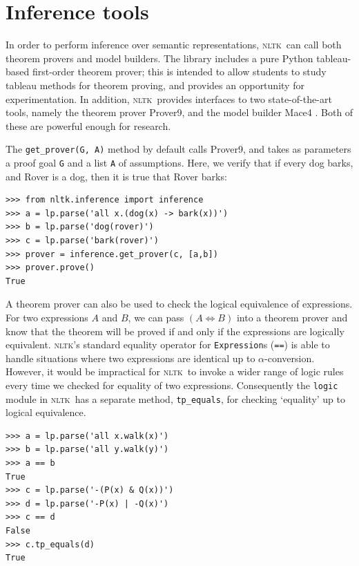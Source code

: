 \documentclass[11pt, a4paper]{article}
\newcommand{\NLTK}{\textsc{nltk}}
\newcommand{\dhgcode}[1]{{\tt #1}}
\begin{document}
\section{Inference tools}
In order to perform inference over semantic representations, \NLTK\
can call both theorem provers and model builders.
The library includes a pure Python tableau-based first-order theorem prover;
this is intended to allow students to study 
tableau methods for theorem proving, and provides an
opportunity for experimentation.  In addition, \NLTK\ provides
interfaces to two state-of-the-art tools, namely the theorem prover Prover9, 
and the model builder Mace4  \citep{McCune}.  Both of these are
powerful enough for research.

The \verb!get_prover(G, A)! method by default calls Prover9, and takes as
parameters a proof goal \texttt{G} and a list \texttt{A} of assumptions.
Here, we verify that if every dog barks, and Rover is a dog,
then it is true that Rover barks:
\begin{Verbatim}
>>> from nltk.inference import inference
>>> a = lp.parse('all x.(dog(x) -> bark(x))')
>>> b = lp.parse('dog(rover)')
>>> c = lp.parse('bark(rover)')
>>> prover = inference.get_prover(c, [a,b])
>>> prover.prove()
True
\end{Verbatim}

A theorem prover can also be used to check the logical equivalence of
expressions.  For two expressions $A$ and $B$, we can pass $(A\iff B)$
into a theorem prover and know that the theorem will be proved if and
only if the expressions are logically equivalent.  \NLTK's standard
equality operator for \texttt{Expression}s (\texttt{==}) is able to
handle situations where two expressions are identical up to
$\alpha$-conversion.  However, it would be impractical for \NLTK\ to
invoke a wider range of logic rules every time we checked for equality
of two expressions. Consequently the \texttt{logic} module in \NLTK\
has a separate method, \dhgcode{tp\_equals}, for checking `equality'
up to logical equivalence.

\begin{Verbatim}
>>> a = lp.parse('all x.walk(x)')
>>> b = lp.parse('all y.walk(y)')
>>> a == b
True
>>> c = lp.parse('-(P(x) & Q(x))')
>>> d = lp.parse('-P(x) | -Q(x)')
>>> c == d
False
>>> c.tp_equals(d)
True
\end{Verbatim}

\end{document}
